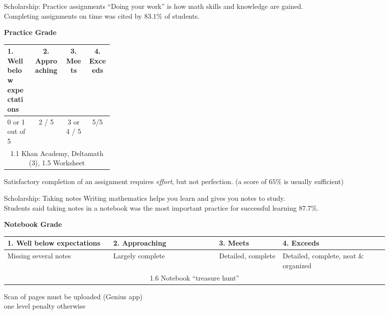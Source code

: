 \begin{frame}{Scholarship: Practice assignments}
    ``Doing your work'' is how math skills and knowledge are gained.\\[0.25cm]
    Completing assignments on time was cited by $83.1\%$ of students. \vspace{0.5cm}
      \begin{table}[ht]
        \textbf{Practice Grade}
      \begin{tabular}[t]{p{0.25\linewidth} c c c }%
        \hline
        1. Well below \newline expectations & 2. Approaching & 3. Meets & 4. Exceeds \\
        \hline
        \hspace{0.25cm} 0 or 1 out of 5 & 2 / 5 & 3 or 4 / 5 & 5/5 \\[0.25cm]
        \multicolumn{4}{c}{1.1 Khan Academy, Deltamath (3), 1.5 Worksheet} \\[0.25cm]
        \hline
      \end{tabular}
    \end{table} \vspace{0.25cm}
      Satisfactory completion of an assignment requires \emph{effort}, but not perfection. (a score of $65\%$ is usually sufficient)
      \vspace{1cm}
  \end{frame}

  \begin{frame}{Scholarship: Taking notes}
    Writing mathematics helps you learn and gives you notes to study.\\[0.25cm]
      Students said taking notes in a notebook was the most important practice for successful learning $87.7\%$. \vspace{0.5cm}
      \begin{table}[ht]
        \textbf{Notebook Grade}
        \begin{tabular}[t]{p{0.25\linewidth} p{0.25\linewidth} p{0.15\linewidth} p{0.25\linewidth}}
          \hline
          1. Well below \newline expectations & 2. Approaching & 3. Meets & 4. Exceeds \\
          \hline
          Missing several notes & Largely complete & Detailed, \newline complete & Detailed, complete, neat \& organized \\[0.25cm]
          \multicolumn{4}{c}{1.6 Notebook ``treasure hunt''} \\[0.25cm]
          \hline
        \end{tabular}
      \end{table} \vspace{0.25cm}
    Scan of pages must be uploaded (Genius app) \\one level penalty otherwise \vspace{1cm}
  \end{frame}

  
